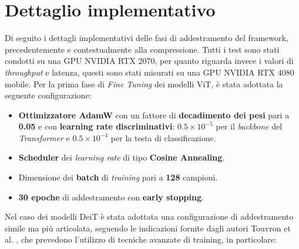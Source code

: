 \section{Dettaglio implementativo}
\label{section:impl}
Di seguito i dettagli implementativi delle fasi di addestramento del framework, precedentemente e contestualmente alla compressione. Tutti i test sono stati condotti su una GPU NVIDIA RTX 2070, per quanto riguarda invece i valori di \textit{throughput} e latenza, questi sono stati misurati su una GPU NVIDIA RTX 4080 mobile. Per la prima fase di \textit{Fine Tuning} dei modelli ViT, è stata adottata la seguente configurazione:
\begin{itemize}
    \item \textbf{Ottimizzatore AdamW} con un fattore di \textbf{decadimento dei pesi} pari a \textbf{0.05} e con \textbf{learning rate discriminativi}: \textbf{$0.5 \times 10^{-5}$} per il \textit{backbone} del \textit{Transformer} e \textbf{$0.5 \times 10^{-4}$} per la testa di classificazione.
    \item \textbf{Scheduler} dei \textit{learning rate} di tipo \textbf{Cosine Annealing}.
    \item Dimensione dei \textbf{batch} di \textit{training} pari a \textbf{128}
          campioni.
    \item \textbf{30 epoche} di addestramento con \textbf{early stopping}.
\end{itemize}
Nel caso dei modelli DeiT è stata adottata una configurazione di addestramento simile ma più articolata, seguendo le indicazioni fornite dagli autori Touvron et al. \cite{touvron2021trainingdataefficientimagetransformers}, che prevedono l'utilizzo di tecniche avanzate di training, in particolare:
